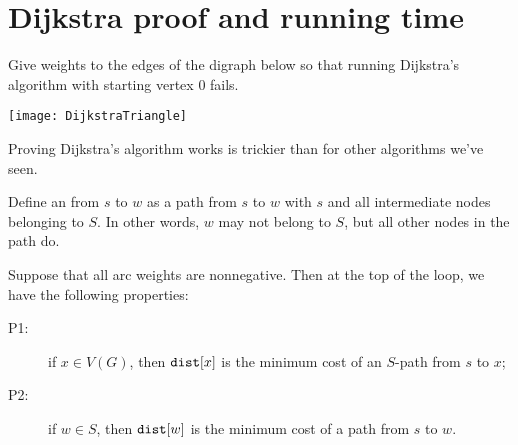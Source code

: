 \chapter{Dijkstra proof and running time} %

\begin{Boxample}[0.5] \label{ex:dijk-neg-fails}
Give weights to the edges of the digraph below so that running Dijkstra's algorithm with starting vertex $0$
fails. 
\vspace{0.5cm} 
\begin{center}
\texttt{[image: DijkstraTriangle]}
\end{center}
\end{Boxample}


Proving Dijkstra's algorithm works is trickier than for other algorithms we've seen.

Define an  from $s$ to $w$ as a
path from $s$ to $w$ with $s$ and all intermediate nodes belonging to $S$. In other words, $w$ may not belong to $S$, but all other nodes in the path do.

\begin{Theorem}
\label{thm:dijkstra} Suppose that all arc weights are nonnegative. Then
at the top of the  loop, we have the following properties:
\begin{description}
\item[P1:] if $x\in V(G)$, then $\dist[x]$ is the minimum cost of an $S$-path 
from $s$ to $x$;
\item[P2:] if $w\in S$, then $\dist[w]$ is the minimum cost of a path
from $s$ to $w$.
\end{description}
\end{Theorem}

